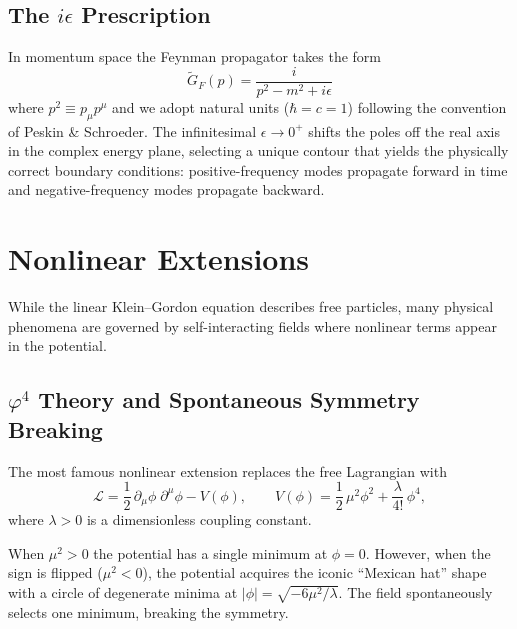 \documentclass[12pt, a4paper]{article}
\theoremstyle{definition}
\begin{document}
\subsection{The $i\epsilon$ Prescription}

In momentum space the Feynman propagator takes the form
\begin{equation}\label{eq:feynman-momentum}
    \boxed{\;
    \tilde{G}_{F}(p)
    = \frac{i}{p^{2} - m^{2} + i\epsilon}
    \;}
\end{equation}
where $p^{2} \equiv p_{\mu}p^{\mu}$ and we adopt natural units
($\hbar = c = 1$) following the convention of Peskin \& Schroeder.  The
infinitesimal $\epsilon \to 0^{+}$ shifts the poles off the real axis in the
complex energy plane, selecting a unique contour that yields the physically
correct boundary conditions: positive-frequency modes propagate forward in
time and negative-frequency modes propagate backward.

\section{Nonlinear Extensions}
\label{sec:nonlinear}

While the linear Klein--Gordon equation describes free particles, many
physical phenomena are governed by self-interacting fields where nonlinear
terms appear in the potential.

\subsection{$\varphi^{4}$ Theory and Spontaneous Symmetry Breaking}

The most famous nonlinear extension replaces the free Lagrangian with
\begin{equation}\label{eq:phi4-lagrangian}
    \mathcal{L}
    = \frac{1}{2}\,\partial_{\mu}\phi\;\partial^{\mu}\phi
    - V(\phi),
    \qquad
    V(\phi) = \frac{1}{2}\,\mu^{2}\phi^{2}
              + \frac{\lambda}{4!}\,\phi^{4},
\end{equation}
where $\lambda > 0$ is a dimensionless coupling constant.

When $\mu^{2} > 0$ the potential has a single minimum at $\phi = 0$.
However, when the sign is flipped ($\mu^{2} < 0$), the potential acquires the
iconic ``Mexican hat'' shape with a circle of degenerate minima at
$|\phi| = \sqrt{-6\mu^{2}/\lambda}$.  The field spontaneously selects one
minimum, breaking the symmetry.
\end{document}
